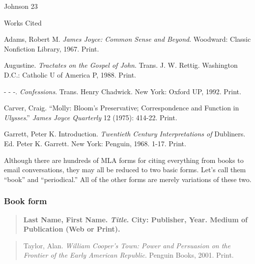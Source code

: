 \documentclass[12pt, hidelinks]{article} %
\newcommand{\tab}{\hspace*{2em}}
\begin{document}
\newpage
\thispagestyle{empty}
\begin{flushright}Johnson 23\end{flushright}
\begin{center}
Works Cited
\end{center}
\begin{doublespace}

Adams, Robert M. \emph{James Joyce: Common Sense and Beyond}. Woodward: Classic \tab Nonfiction Library, 1967. Print.

Augustine. \emph{Tractates on the Gospel of John}. Trans. J. W. Rettig. Washington D.C.: \tab Catholic U 
of America P, 1988. Print.

- - -. \emph{Confessions}. Trans. Henry Chadwick. New York: Oxford UP, 1992. Print.

Carver, Craig. ``Molly: Bloom's Preservative; Correspondence and Function in \tab\emph{Ulysses}.'' \emph{James Joyce Quarterly} 12 (1975): 414-22. Print.

Garrett, Peter K. Introduction. \emph{Twentieth Century Interpretations of} Dubliners. \tab Ed. Peter K. Garrett. New York: Penguin, 1968. 1-17. Print.

\end{doublespace}

\newpage




										                



Although there are hundreds of MLA forms for citing everything from books to email conversations, they may all be reduced to two basic forms. Let's call them ``book'' and ``periodical.'' All of the other forms are merely variations of these two.

\subsubsection{Book form}


\begin{quote}
{\bf Last Name, First Name. \emph{Title}. City: Publisher, Year. Medium \tab of Publication (Web or Print).}
\end{quote}

\medskip
\medskip

\begin{quote}
Taylor, Alan. \emph{William Cooper's Town: Power and Persuasion on the \tab Frontier of the Early American Republic}. Penguin Books, 2001. \tab Print.
\end{quote}
\end{document}
